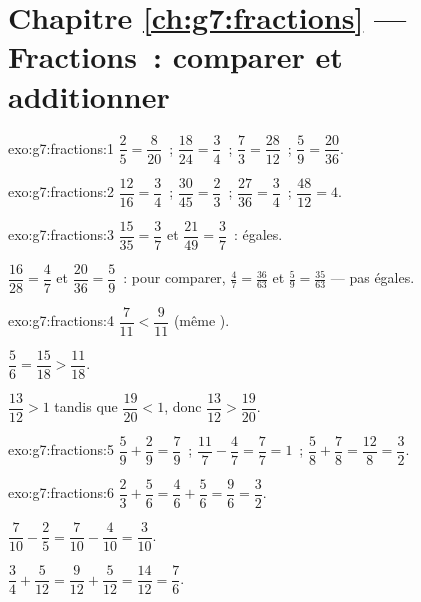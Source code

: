 \section*{Chapitre \ref{ch:g7:fractions} --- Fractions~: comparer et additionner}

\begin{solution}{exo:g7:fractions:1}
$\dfrac{2}{5} = \dfrac{8}{20}$~; \quad
$\dfrac{18}{24} = \dfrac{3}{4}$~; \quad
$\dfrac{7}{3} = \dfrac{28}{12}$~; \quad
$\dfrac{5}{9} = \dfrac{20}{36}$.
\end{solution}

\begin{solution}{exo:g7:fractions:2}
$\dfrac{12}{16} = \dfrac34$~; \quad
$\dfrac{30}{45} = \dfrac23$~; \quad
$\dfrac{27}{36} = \dfrac34$~; \quad
$\dfrac{48}{12} = 4$.
\end{solution}

\begin{solution}{exo:g7:fractions:3}
$\dfrac{15}{35} = \dfrac37$ et $\dfrac{21}{49} = \dfrac37$~: égales.

$\dfrac{16}{28} = \dfrac47$ et $\dfrac{20}{36} = \dfrac59$~: pour
comparer, $\frac47 = \frac{36}{63}$ et $\frac59 = \frac{35}{63}$ ---
pas égales.
\end{solution}

\begin{solution}{exo:g7:fractions:4}
$\dfrac{7}{11} < \dfrac{9}{11}$ (même ).

$\dfrac56 = \dfrac{15}{18} > \dfrac{11}{18}$.

$\dfrac{13}{12} > 1$ tandis que $\dfrac{19}{20} < 1$, donc
$\dfrac{13}{12} > \dfrac{19}{20}$.
\end{solution}

\begin{solution}{exo:g7:fractions:5}
$\dfrac59 + \dfrac29 = \dfrac79$~; \quad
$\dfrac{11}{7} - \dfrac47 = \dfrac77 = 1$~; \quad
$\dfrac58 + \dfrac78 = \dfrac{12}{8} = \dfrac32$.
\end{solution}

\begin{solution}{exo:g7:fractions:6}
$\dfrac23 + \dfrac56 = \dfrac46 + \dfrac56 = \dfrac96 = \dfrac32$.

$\dfrac{7}{10} - \dfrac25 = \dfrac{7}{10} - \dfrac{4}{10} =
\dfrac{3}{10}$.

$\dfrac34 + \dfrac{5}{12} = \dfrac{9}{12} + \dfrac{5}{12} =
\dfrac{14}{12} = \dfrac76$.
\end{solution}

